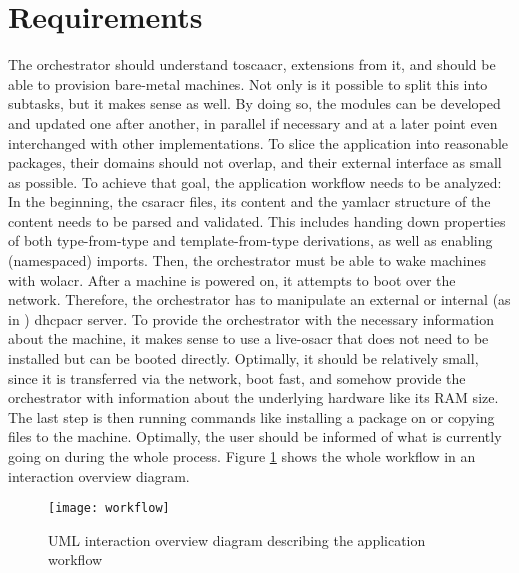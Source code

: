\section{Requirements}
The orchestrator should understand \gls{toscaacr}, extensions from it, and should be able to provision bare-metal machines. Not only is it possible to split this into subtasks, but it makes sense as well. By doing so, the modules can be developed and updated one after another, in parallel if necessary and at a later point even interchanged with other implementations. To slice the application into reasonable packages, their domains should not overlap, and their external interface as small as possible.
\newline
To achieve that goal, the application workflow needs to be analyzed:
\newline
In the beginning, the \gls{csaracr} files, its content and the \gls{yamlacr} structure of the content needs to be parsed and validated. This includes handing down properties of both type-from-type and template-from-type derivations, as well as enabling (namespaced) imports.
Then, the orchestrator must be able to wake machines with \gls{wolacr}.
After a machine is powered on, it attempts to boot over the network.
Therefore, the orchestrator has to manipulate an external or internal (as in ) \gls{dhcpacr} server.
To provide the orchestrator with the necessary information about the machine, it makes sense to use a live-\gls{osacr} that does not need to be installed but can be booted directly. Optimally, it should be relatively small, since it is transferred via the network, boot fast, and somehow provide the orchestrator with information about the underlying hardware like its RAM size.
The last step is then running commands like installing a package on or copying files to the machine. Optimally, the user should be informed of what is currently going on during the whole process.
\newline
Figure \ref{image:workflow} shows the whole workflow in an interaction overview diagram.

\begin{figure}[H]
  \texttt{[image: workflow]}
  \centering
  \caption{UML interaction overview diagram describing the application workflow}
  \label{image:workflow}
\end{figure}

